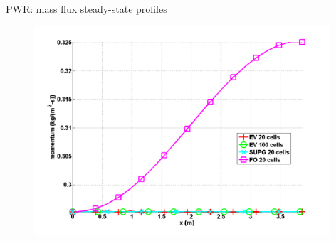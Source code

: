 \documentclass[xcolor=dvipsnames,10pt]{beamer}
\begin{document}
\begin{frame}{PWR: mass flux steady-state profiles}
\begin{figure}
    \centering
    \includegraphics[width=0.98\textwidth]{plots/PWR_stt_momentum.png}
\end{figure}
\end{frame}
\end{document}

